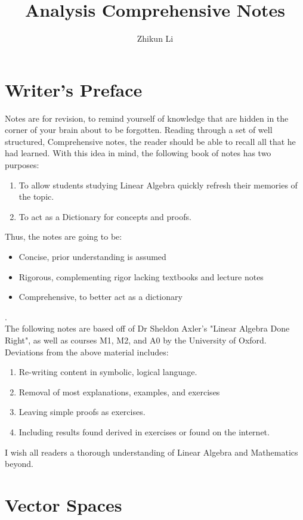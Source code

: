 \documentclass{article}
\title{Analysis Comprehensive Notes}
\author{Zhikun Li}
\date{}
\newcommand{\0}{{\bf{0}}}
\begin{document}
\maketitle
\section*{Writer's Preface}
Notes are for revision, to remind yourself of knowledge that are hidden in the corner of your brain about to be forgotten. Reading through a set of well structured, Comprehensive notes, the reader should be able to recall all that he had learned. With this idea in mind, the following book of notes has two purposes:
\begin{enumerate}
    \item To allow students studying Linear Algebra quickly refresh their memories of the topic.
    \item To act as a Dictionary for concepts and proofs.
\end{enumerate}
Thus, the notes are going to be: 
\begin{itemize}
    \item Concise, prior understanding is assumed
    \item Rigorous, complementing rigor lacking textbooks and lecture notes
    \item Comprehensive, to better act as a dictionary
\end{itemize} .\\
The following notes are based off of Dr Sheldon Axler's "Linear Algebra Done Right", as well as courses M1, M2, and A0 by the University of Oxford. Deviations from the above material includes:
\begin{enumerate}
    \item Re-writing content in symbolic, logical language.
    \item Removal of most explanations, examples, and exercises
    \item Leaving simple proofs as exercises.
    \item Including results found derived in exercises or found on the internet.
\end{enumerate}
I wish all readers a thorough understanding of Linear Algebra and Mathematics beyond.
\tableofcontents
\clearpage
\section{Vector Spaces}
\end{document}
